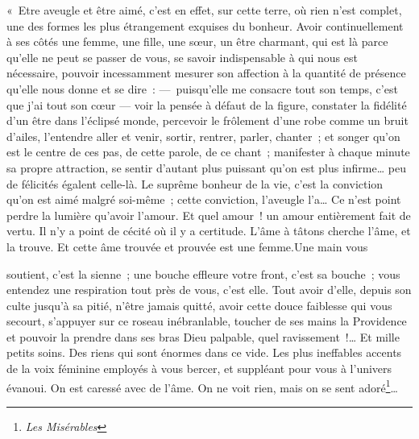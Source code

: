 \documentclass[french,twoside]{book} %
\newenvironment{quoteblock}%
  {\begin{quoting}}
  {\end{quoting}}
\newenvironment{quotebar}{%
    \def\FrameCommand{{\color{rubric!10!}\vrule width 0.5em} \hspace{0.9em}}%
    \def\OuterFrameSep{\itemsep} %
    \MakeFramed {\advance\hsize-\width \FrameRestore}
  }%
  {%
    \endMakeFramed
  }
\renewenvironment{quoteblock}%
  {%
    \savenotes
    \setstretch{0.9}
    \normalfont
    \begin{quotebar}
  }
  {%
    \end{quotebar}
    \spewnotes
  }
\begin{document}
\begin{quoteblock}
 \noindent « Etre aveugle et être aimé, c’est en effet, sur cette terre, où rien n’est complet, une des formes les plus étrangement exquises du bonheur. Avoir continuellement à ses côtés une femme, une fille, une sœur, un être charmant, qui est là parce qu’elle ne peut se passer de vous, se savoir indispensable à qui nous est nécessaire, pouvoir incessamment mesurer son affection à la quantité de présence qu’elle nous donne et se dire : — puisqu’elle me consacre tout son temps, c’est que j’ai tout son cœur — voir la pensée à défaut de la figure, constater la fidélité d’un être dans l’éclipsé monde, percevoir le frôlement d’une robe comme un bruit d’ailes, l’entendre aller et venir, sortir, rentrer, parler, chanter ; et songer qu’on est le centre de ces pas, de cette parole, de ce chant ; manifester à chaque minute sa propre attraction, se sentir d’autant plus puissant qu’on est plus infirme… peu de félicités égalent celle-là. Le suprême bonheur de la vie, c’est la conviction qu’on est aimé malgré soi-même ; cette conviction, l’aveugle l’a… Ce n’est point perdre la lumière qu’avoir l’amour. Et quel amour ! un amour entièrement fait de vertu. Il n’y a point de cécité où il y a certitude. L’âme à tâtons cherche l’âme, et la trouve. Et cette âme trouvée et prouvée est une femme.Une main vous\par
 soutient, c’est la sienne ; une bouche effleure votre front, c’est sa bouche ; vous entendez une respiration tout près de vous, c’est elle. Tout avoir d’elle, depuis son culte jusqu’à sa pitié, n’être jamais quitté, avoir cette douce faiblesse qui vous secourt, s’appuyer sur ce roseau inébranlable, toucher de ses mains la Providence et pouvoir la prendre dans ses bras Dieu palpable, quel ravissement !… Et mille petits soins. Des riens qui sont énormes dans ce vide. Les plus ineffables accents de la voix féminine employés à vous bercer, et suppléant pour vous à l’univers évanoui. On est caressé avec de l’âme. On ne voit rien, mais on se sent adoré\footnote{\emph{Les Misérables}}…
 \end{quoteblock}
\end{document}
